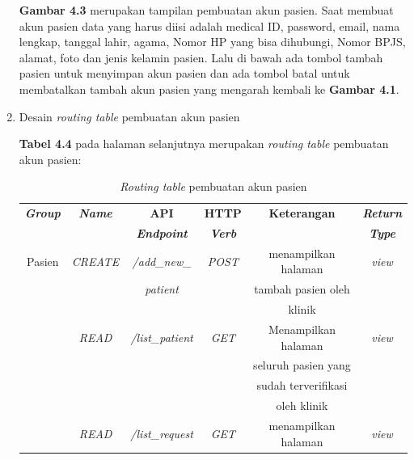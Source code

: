 \begin{enumerate}
	\textbf{Gambar 4.3} merupakan tampilan pembuatan akun pasien. Saat membuat akun pasien data yang harus diisi adalah medical ID, password, email, nama lengkap, tanggal lahir, agama, Nomor HP yang bisa dihubungi, Nomor BPJS, alamat, foto dan jenis kelamin pasien. Lalu di bawah ada tombol tambah pasien untuk menyimpan akun pasien dan ada tombol batal untuk membatalkan tambah akun pasien yang mengarah kembali ke \textbf{Gambar 4.1}. 
	
	\item Desain \emph{routing table} pembuatan akun pasien
	
	\textbf{Tabel 4.4} pada halaman selanjutnya merupakan \emph{routing table} pembuatan akun pasien:
	
	\begin{table}[H]
		\centering
		\caption{\emph{Routing table} pembuatan akun pasien}
		\label{tabel_input}
		\begin{tabular}{|c|c|c|c|c|c|}
			\hline
			\textbf{\emph{Group}} & \textbf{\emph{Name}} & \textbf{API} & \textbf{HTTP} & \textbf{Keterangan} & \textbf{\emph{Return}} \\
			
			& & \textbf{\emph{Endpoint}} & \textbf{\emph{Verb}} & & \textbf{\emph{Type}} \\
			\hline

			Pasien & 
			\emph{CREATE} &
			\emph{/add\_new\_}
			&
			\emph{POST} &
			menampilkan halaman &
			\emph{view}\\
			
			& 
			&
			\emph{patient}&
			&
			tambah pasien oleh&\\
			
			& 
			&
			&
			&
			klinik&\\
			\hline
			
			& 
			\emph{READ} &
			\emph{/list\_patient}&
			\emph{GET} &
			Menampilkan halaman&
			\emph{view}\\
			
			& 
			&
			&
			&
			seluruh pasien yang &\\
			
			& 
			&
			&
			&
			sudah terverifikasi &\\
			
			& 
			&
			&
			&
			oleh klinik &\\
			\hline
			
			& 
			\emph{READ} &
			\emph{/list\_request}
			&
			\emph{GET} &
			menampilkan halaman &
			\emph{view}\\
			

\end{tabular}
\end{table}
\end{enumerate}
